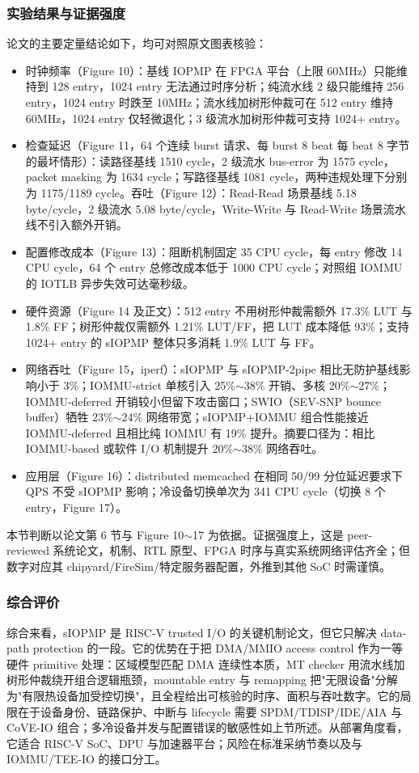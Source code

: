 \documentclass[11pt]{ctexart}
\begin{document}
\subsubsection{实验结果与证据强度}
论文的主要定量结论如下，均可对照原文图表核验：\par
\begin{itemize}
\item 时钟频率（Figure 10）：基线 IOPMP 在 FPGA 平台（上限 60MHz）只能维持到 128 entry，1024 entry 无法通过时序分析；纯流水线 2 级只能维持 256 entry，1024 entry 时跌至 10MHz；流水线加树形仲裁可在 512 entry 维持 60MHz，1024 entry 仅轻微退化；3 级流水加树形仲裁可支持 1024+ entry。
\item 检查延迟（Figure 11，64 个连续 burst 请求、每 burst 8 beat 每 beat 8 字节的最坏情形）：读路径基线 1510 cycle，2 级流水 bus-error 为 1575 cycle，packet masking 为 1634 cycle；写路径基线 1081 cycle，两种违规处理下分别为 1175/1189 cycle。吞吐（Figure 12）：Read-Read 场景基线 5.18 byte/cycle，2 级流水 5.08 byte/cycle，Write-Write 与 Read-Write 场景流水线不引入额外开销。
\item 配置修改成本（Figure 13）：阻断机制固定 35 CPU cycle，每 entry 修改 14 CPU cycle，64 个 entry 总修改成本低于 1000 CPU cycle；对照组 IOMMU 的 IOTLB 异步失效可达毫秒级。
\item 硬件资源（Figure 14 及正文）：512 entry 不用树形仲裁需额外 17.3\% LUT 与 1.8\% FF；树形仲裁仅需额外 1.21\% LUT/FF，把 LUT 成本降低 93\%；支持 1024+ entry 的 sIOPMP 整体只多消耗 1.9\% LUT 与 FF。
\item 网络吞吐（Figure 15，iperf）：sIOPMP 与 sIOPMP-2pipe 相比无防护基线影响小于 3\%；IOMMU-strict 单核引入 25\%$\sim$38\% 开销、多核 20\%$\sim$27\%；IOMMU-deferred 开销较小但留下攻击窗口；SWIO（SEV-SNP bounce buffer）牺牲 23\%$\sim$24\% 网络带宽；sIOPMP+IOMMU 组合性能接近 IOMMU-deferred 且相比纯 IOMMU 有 19\% 提升。摘要口径为：相比 IOMMU-based 或软件 I/O 机制提升 20\%$\sim$38\% 网络吞吐。
\item 应用层（Figure 16）：distributed memcached 在相同 50/99 分位延迟要求下 QPS 不受 sIOPMP 影响；冷设备切换单次为 341 CPU cycle（切换 8 个 entry，Figure 17）。
\end{itemize}
本节判断以论文第 6 节与 Figure 10$\sim$17 为依据。证据强度上，这是 peer-reviewed 系统论文，机制、RTL 原型、FPGA 时序与真实系统网络评估齐全；但数字对应其 chipyard/FireSim/特定服务器配置，外推到其他 SoC 时需谨慎。\par
\subsubsection{综合评价}
综合来看，sIOPMP 是 RISC-V trusted I/O 的关键机制论文，但它只解决 data-path protection 的一段。它的优势在于把 DMA/MMIO access control 作为一等硬件 primitive 处理：区域模型匹配 DMA 连续性本质，MT checker 用流水线加树形仲裁绕开组合逻辑瓶颈，mountable entry 与 remapping 把"无限设备"分解为"有限热设备加受控切换"，且全程给出可核验的时序、面积与吞吐数字。它的局限在于设备身份、链路保护、中断与 lifecycle 需要 SPDM/TDISP/IDE/AIA 与 CoVE-IO 组合；多冷设备并发与配置错误的敏感性如上节所述。从部署角度看，它适合 RISC-V SoC、DPU 与加速器平台；风险在标准采纳节奏以及与 IOMMU/TEE-IO 的接口分工。\par
\end{document}
